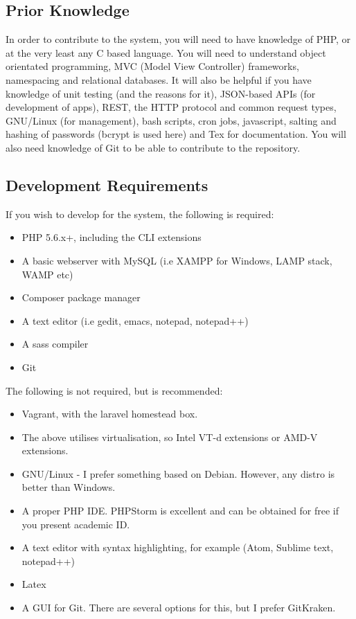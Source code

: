\documentclass{article}
\begin{document}
\subsection{Prior Knowledge}
In order to contribute to the system, you will need to have knowledge of PHP, or at the very least any C based language. You will need to understand object orientated programming, MVC (Model View Controller) frameworks, namespacing and relational databases. It will also be helpful if you have knowledge of unit testing (and the reasons for it), JSON-based APIs (for development of apps), REST, the HTTP protocol and common request types, GNU/Linux (for management), bash scripts, cron jobs, javascript, salting and hashing of passwords (bcrypt is used here) and Tex for documentation. You will also need knowledge of Git to be able to contribute to the repository.

\subsection{Development Requirements}
If you wish to develop for the system, the following is required:

\begin{itemize}
	\item PHP 5.6.x+, including the CLI extensions
	\item A basic webserver with MySQL (i.e XAMPP for Windows, LAMP stack, WAMP etc)
	\item Composer package manager
	\item A text editor (i.e gedit, emacs, notepad, notepad++)
	\item A sass compiler
	\item Git
\end{itemize}

The following is not required, but is recommended:
\begin{itemize}
	\item Vagrant, with the laravel homestead box.
	\item The above utilises virtualisation, so Intel VT-d extensions or AMD-V extensions.
	\item GNU/Linux -  I prefer something based on Debian. However, any distro is better than Windows.
	\item A proper PHP IDE. PHPStorm is excellent and can be obtained for free if you present academic ID.
	\item A text editor with syntax highlighting, for example (Atom, Sublime text, notepad++)
	\item Latex
	\item A GUI for Git. There are several options for this, but I prefer GitKraken.
\end{itemize}
\end{document}

